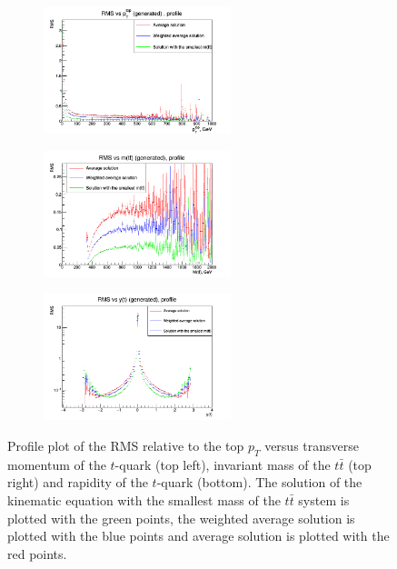 \begin{figure}[h]
\centering
\begin{subfigure}
  \centering
  \includegraphics[width=0.6\textwidth]{10_appendices/min_Mtt/plots/Abs-pt.png}
\end{subfigure}
\begin{subfigure}
  \centering
  \includegraphics[width=0.6\textwidth]{10_appendices/min_Mtt/plots/Abs-mtt.png}
\end{subfigure}
\begin{subfigure}
  \centering
  \includegraphics[width=0.6\textwidth]{10_appendices/min_Mtt/plots/Abs-y.png}
\end{subfigure}
\caption{Profile plot of the RMS relative to the top $p_{T}$ versus transverse momentum of the $t$-quark (top left), invariant mass of the $t\bar{t}$ (top right) and rapidity of the
$t$-quark (bottom). The solution of the kinematic equation with the smallest mass of the $t\bar{t}$ system is plotted with the green points, the weighted average solution is plotted
with the blue points and average solution is plotted with the red points.}
\label{fig:Absvs}
\end{figure}